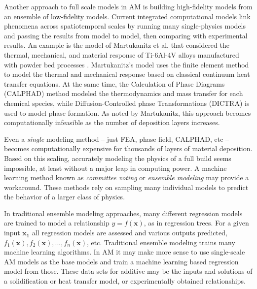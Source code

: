 Another approach to full scale models in AM is building high-fidelity models from an ensemble of low-fidelity models. Current integrated computational models link phenomena across spatiotemporal scales by running many single-physics models and passing the results from model to model, then comparing with experimental results. An example is the model of Martukanitz et al. that considered the thermal, mechanical, and material response of Ti-6Al-4V alloys manufactured with powder bed processes \cite{Martukanitz2014}. Martukanitz's model uses the finite element method to model the thermal and mechanical response based on classical continuum heat transfer equations. At the same time, the Calculation of Phase Diagrams (CALPHAD) method modeled the thermodynamics and mass transfer for each chemical species, while Diffusion-Controlled phase Transformations (DICTRA) is used to model phase formation. As noted by Martukanitz, this approach becomes computationally infeasible as the number of deposition layers increases.

Even a \textit{single} modeling method -- just FEA, phase field, CALPHAD, etc -- becomes computationally expensive for thousands of layers of material deposition. Based on this scaling, accurately modeling the physics of a full build seems impossible, at least without a major leap in computing power. A machine learning method known as \textit{committee voting} or \textit{ensemble modeling} may provide a workaround. These methods rely on sampling many individual models to predict the behavior of a larger class of physics.

In traditional ensemble modeling approaches, many different regression models are trained to model a relationship $y = f(\mathbf{x})$, as in regression trees. For a given input $\mathbf{x_1}$ all regression models are assessed and various outputs predicted, $f_1(\mathbf{x}), f_2(\mathbf{x}), ..., f_n(\mathbf{x})$, etc. Traditional ensemble modeling trains many machine learning algorithms. In AM it may make more sense to use single-scale AM models as the base models and train a machine learning based regression model from those. These data sets for additive may be the inputs and solutions of a solidification or heat transfer model, or experimentally obtained relationships.

